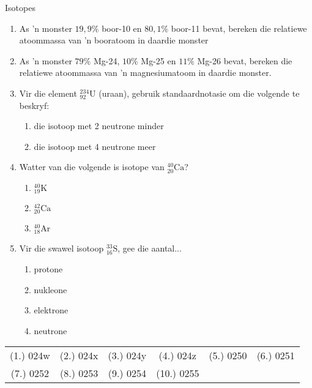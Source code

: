 \begin{exercises}{Isotopes}
{\begin{enumerate}[noitemsep, label=\textbf{\arabic*}. ]
\item As 'n monster $19,9\%$ boor-10 en $80,1\%$ boor-11 bevat, bereken die relatiewe atoommassa van 'n booratoom in daardie monster  

\item As 'n monster $79\%$ Mg-24, $10\%$ Mg-25 en $11\%$ Mg-26 bevat, bereken die relatiewe atoommassa van 'n magnesiumatoom in daardie monster.

\item Vir die element $^{234}_{92}{\text{U}}$ (uraan), gebruik standaardnotasie om die volgende te beskryf:
\begin{enumerate}[noitemsep, label=\textbf{\alph*}. ]
\item die isotoop met 2 neutrone minder
\item die isotoop met 4 neutrone meer
\end{enumerate}

\item Watter van die volgende is isotope van $^{40}_{20}\text{Ca}$?
\begin{enumerate}[noitemsep, label=\textbf{\alph*}. ]
\item $^{40}_{19}\text{K}$
\item $^{42}_{20}\text{Ca}$
\item $^{40}_{18}\text{Ar}$
\end{enumerate}

\item Vir die swawel isotoop $^{33}_{16}\text{S}$, gee die aantal...
\begin{enumerate}[noitemsep, label=\textbf{\alph*}. ]
\item{protone}
\item{nukleone}
\item{elektrone}
\item{neutrone}
\end{enumerate}
\hspace{1ex}        
\end{enumerate}

\par \practiceinfo
\par \begin{tabular}[h]{cccccc}
(1.)	024w	&
(2.)	024x	&
(3.)	024y	&
(4.)	024z	&
(5.)	0250	&
(6.)	0251	\\ %
(7.)	0252	&
(8.)	0253	&
(9.)	0254	&
(10.)	0255	&
\end{tabular}
}
\end{exercises}



